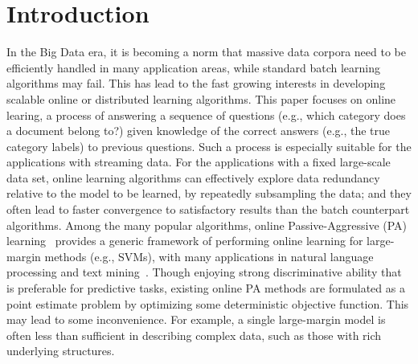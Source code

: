 \documentclass[twoside,11pt]{article}
\begin{document}
\section{Introduction}


In the Big Data era, it is becoming a norm that massive data corpora need to be efficiently handled in many application areas, while standard batch learning algorithms may fail. This has lead to the fast growing interests in developing scalable online or distributed learning algorithms. This paper focuses on online learing, a process of answering a sequence of questions (e.g., which category does a document belong to?) given knowledge of the correct answers (e.g., the true category labels) to previous questions. Such a process is especially suitable for the applications with streaming data. For the applications with a fixed large-scale data set, online learning algorithms can effectively explore data redundancy relative to the model to be learned, by repeatedly subsampling the data; and they often lead to faster convergence to satisfactory results than the batch counterpart algorithms. Among the many popular algorithms, online Passive-Aggressive (PA) learning~\citep{crammer2006pa} provides a generic framework of performing online learning for large-margin methods (e.g., SVMs), with many applications in natural language processing and text mining~\citep{McDonald2005parsing, chiang2008emnlp}. Though enjoying strong discriminative ability that is preferable for predictive tasks, existing online PA methods are formulated as a point estimate problem by optimizing some deterministic objective function. This may lead to some inconvenience. For example, a single large-margin model is often less than sufficient in describing complex data, such as those with rich underlying structures. %
\end{document}
